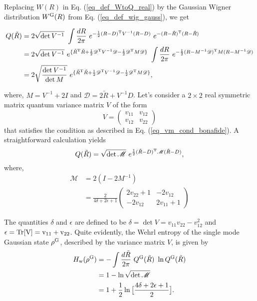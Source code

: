 \documentclass[letter,scriptaddress,twocolumn,prl,showkeys]{revtex4}
\begin{document}
Replacing $W(R)$ in Eq. (\ref{eq_def_WtoQ_real}) by the Gaussian Wigner distribution $W^{\rm{G}}(R)$ from Eq. (\ref{eq_def_wig_gauss}), we get
\begin{widetext}
\begin{align}
Q(\tilde{R})& = 2\sqrt{\det V^{-1}}~ \int\frac{dR}{2\pi}~ e^{-\frac{1}{2}(R-D)^{\rm{T}} V^{-1} (R-D)}~ e^{-(R-\tilde{R})^{\rm{T}}(R-\tilde{R})} \nonumber \\
& = 2\sqrt{\det V^{-1}}~ e^{\lbrace \tilde{R}^{\rm{T}}\tilde{R} + \frac{1}{2}\mathscr{D}^{\rm{T}} V^{-1} \mathscr{D} - \frac{1}{2}\mathscr{D}^{\rm{T}} M \mathscr{D}\rbrace}~ \int\frac{dR}{2\pi}~ e^{-\frac{1}{2}(R-M^{-1}\mathscr{D})^{\rm{T}}M(R-M^{-1}\mathscr{D})} \nonumber \\
& = 2\sqrt{\frac{\det V^{-1}}{\det M}}~ e^{\lbrace \tilde{R}^{\rm{T}}\tilde{R} + \frac{1}{2}\mathscr{D}^{\rm{T}} V^{-1} \mathscr{D} - \frac{1}{2}\mathscr{D}^{\rm{T}} M \mathscr{D}\rbrace},
\end{align}
\end{widetext}
where, $M = V^{-1} + 2I$ and $\mathscr{D} = 2\tilde{R} + V^{-1}D$.
Let's consider a $2\times 2$ real symmetric matrix quantum variance matrix $V$ of the form
\begin{equation}
V = \begin{pmatrix}
v_{11} & v_{12}\\
v_{12} & v_{22}
\end{pmatrix}
\end{equation}
that satisfies the condition as described in Eq. (\ref{eq_vm_cond_bonafide}). 
A straightforward calculation yields
\begin{equation}
Q(\tilde{R}) = \sqrt{\det \mathscr{M}}~ e^{\frac{1}{2}(\tilde{R}-D)^{\rm{T}}\mathscr{M}(\tilde{R}-D)},
\label{eq_def_qdist_gauss}
\end{equation}
where,
\begin{align}
\mathscr{M}& = 2(I - 2M^{-1}) \nonumber \\
& = \frac{2}{4\delta + 2\epsilon + 1}\begin{pmatrix}
2v_{22} + 1 & -2v_{12} \\
-2v_{12} & 2v_{11} + 1
\end{pmatrix}
\end{align}

The quantities $\delta$ and $\epsilon$ are defined to be $\delta = \det V = v_{11}v_{22} - v_{12}^{2}$ and $\epsilon = \rm{Tr}[V] = v_{11} + v_{22}$.
Quite evidently, the Wehrl entropy of the single mode Gaussian state $\rho^{\rm{G}}$, described by the variance matrix $V$, is given by
\begin{align}
H_{\rm{w}}(\rho^{\rm{G}})& = -\int\frac{d\tilde{R}}{2\pi}~Q^{\rm{G}}(\tilde{R})~ \ln Q^{\rm{G}}(\tilde{R}) \nonumber \\
& =  1 - \ln \sqrt{\det \mathscr{M}} \nonumber \\
& =  1 + \frac{1}{2} \ln \big[\frac{4\delta + 2\epsilon + 1}{2} \big].
\end{align}
\end{document}
